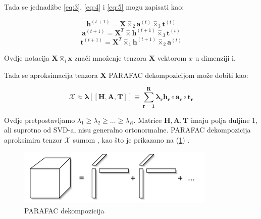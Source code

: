 \documentclass[11pt]{article}
\begin{document}
\begin{flushleft}
Tada se jednadžbe \ref{eq:3}, \ref{eq:4} i \ref{eq:5} mogu zapisati kao:
\end{flushleft}
\begin{equation}
    \boldsymbol{h}^{(t+1)} = \boldsymbol{X} \overset{-}{\times}_{2} \boldsymbol{a}^{(t)}  \overset{-}{\times}_{3} \boldsymbol{t}^{(t)}
\end{equation}
\begin{equation}
    \boldsymbol{a}^{(t+1)} = \boldsymbol{X}^{T}\overset{-}{\times} \boldsymbol{h}^{(t+1)} \overset{-}{\times}_{3} \boldsymbol{t}^{(t)}
\end{equation}
\begin{equation}
    \boldsymbol{t}^{(t+1)} = \boldsymbol{X}^{T}\overset{-}{\times}_{1} \boldsymbol{h}^{(t+1)} \overset{-}{\times}_{2} \boldsymbol{a}^{(t)}
\end{equation}

\begin{flushleft}
Ovdje notacija $\boldsymbol{X}\overset{-}{\times}_{i} \boldsymbol{x}$ znači množenje  tenzora $\boldsymbol{X}$ vektorom $x$ u dimenziji i.
\end{flushleft}
\begin{flushleft}
Tada se aproksimacija tenzora $\boldsymbol{X}$ PARAFAC dekompozicijom može dobiti kao:
\end{flushleft}
\begin{equation}
    \boldsymbol{\mathcal{X} \approx \lambda [\![ H, A, T ]\!] \equiv \sum_{r = 1}^{R} \lambda_{r} h_{r} \circ a_{r} \circ t_{r}}
\end{equation}

\begin{raggedleft}
Ovdje pretpostavljamo $\lambda_{1} \ge \lambda_{2} \ge \ldots \ge \lambda_{R}$.
Matrice $\boldsymbol{H, A, T}$ imaju polja duljine 1, ali suprotno od SVD-a, nisu generalno ortonormalne. PARAFAC dekompozicija aproksimira tenzor $\boldsymbol{\mathcal{X}}$ sumom , kao što je  prikazano na (\ref{fig:3}) .
\end{raggedleft}

\begin{figure}[hbt!]
    \centering
    \includegraphics[width= \textwidth]{parafac.png}  
    \caption{PARAFAC dekompozicija}
    \label{fig:3}
\end{figure}
\end{document}
